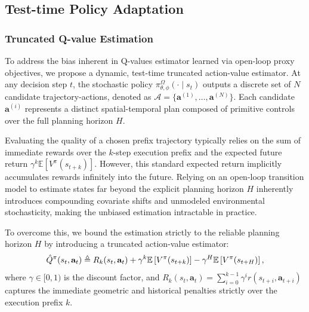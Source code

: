 \documentclass{article}
\begin{document}
\subsection{Test-time Policy Adaptation}
\label{subsec:test_time_adaptation}

\subsubsection{Truncated Q-value Estimation}
\label{subsubsec:intrinsic_q_estimation}

To address the bias inherent in Q-values estimator learned via open-loop proxy objectives, we propose a dynamic, test-time truncated action-value estimator.
At any decision step $t$, the stochastic policy $\pi^{\Omega}_{\theta, \phi}(\cdot \mid s_t)$ outputs a discrete set of $N$ candidate trajectory-actions, denoted as $\mathcal{A} = \{\mathbf{a}^{(1)}, \dots, \mathbf{a}^{(N)}\}$. Each candidate $\mathbf{a}^{(i)}$ represents a distinct spatial-temporal plan composed of primitive controls over the full planning horizon $H$.

Evaluating the quality of a chosen prefix trajectory typically relies on the sum of immediate rewards over the $k$-step execution prefix and the expected future return $\gamma^k \mathbb{E} [ V^\pi(s_{t+k}) ]$. However, this standard expected return implicitly accumulates rewards infinitely into the future. Relying on an open-loop transition model to estimate states far beyond the explicit planning horizon $H$ inherently introduces compounding covariate shifts and unmodeled environmental stochasticity, making the unbiased estimation intractable in practice.

To overcome this, we bound the estimation strictly to the reliable planning horizon $H$ by introducing a truncated action-value estimator:
\begin{equation}
\small
    \label{eq:q_estimator_exact}
    \hat{Q}^{\pi}(s_t, \mathbf{a}_t) \triangleq R_k(s_t, \mathbf{a}_t) + \gamma^k \mathbb{E} \left[ V^\pi(s_{t+k}) \right] - \gamma^H \mathbb{E} \left[ V^\pi(s_{t+H}) \right],
\end{equation}
where $\gamma \in [0, 1)$ is the discount factor, and $R_k(s_t, \mathbf{a}_t) = \sum_{i=0}^{k-1} \gamma^{i} r(s_{t+i}, \mathbf{a}_{t+i})$ captures the immediate geometric and historical penalties strictly over the execution prefix $k$. 
\end{document}
